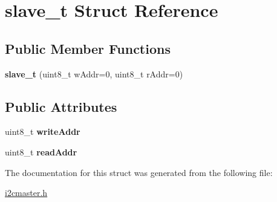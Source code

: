\hypertarget{structslave__t}{}\section{slave\+\_\+t Struct Reference}
\label{structslave__t}
\subsection*{Public Member Functions}
\begin{DoxyCompactItemize}
\item 
\mbox{\label{structslave__t_a50d44b07fa05774c4c213fc5d1507227}} 
{\bfseries slave\+\_\+t} (uint8\+\_\+t w\+Addr=0, uint8\+\_\+t r\+Addr=0)
\end{DoxyCompactItemize}
\subsection*{Public Attributes}
\begin{DoxyCompactItemize}
\item 
\mbox{\label{structslave__t_a196e25cee6c8b9b6d8f66cfcba13feff}} 
uint8\+\_\+t {\bfseries write\+Addr}
\item 
\mbox{\label{structslave__t_a014945119b5636f2aa55604e1b63c3d2}} 
uint8\+\_\+t {\bfseries read\+Addr}
\end{DoxyCompactItemize}


The documentation for this struct was generated from the following file\+:\begin{DoxyCompactItemize}
\item 
\hyperlink{i2cmaster_8h}{i2cmaster.\+h}\end{DoxyCompactItemize}
